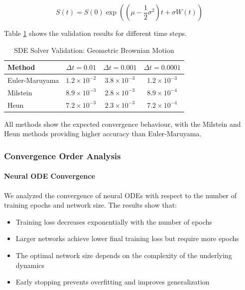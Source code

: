 \begin{equation}
S(t) = S(0) \exp\left((\mu - \frac{1}{2}\sigma^2)t + \sigma W(t)\right)
\end{equation}

Table \ref{tab:sde_validation} shows the validation results for different time steps.

\begin{table}[h]
\centering
\caption{SDE Solver Validation: Geometric Brownian Motion}
\label{tab:sde_validation}
\begin{tabular}{lccc}
\toprule
Method & $\Delta t = 0.01$ & $\Delta t = 0.001$ & $\Delta t = 0.0001$ \\
\midrule
Euler-Maruyama & $1.2 \times 10^{-2}$ & $3.8 \times 10^{-3}$ & $1.2 \times 10^{-3}$ \\
Milstein & $8.9 \times 10^{-3}$ & $2.8 \times 10^{-3}$ & $8.9 \times 10^{-4}$ \\
Heun & $7.2 \times 10^{-3}$ & $2.3 \times 10^{-3}$ & $7.2 \times 10^{-4}$ \\
\bottomrule
\end{tabular}
\end{table}

All methods show the expected convergence behaviour, with the Milstein and Heun methods providing higher accuracy than Euler-Maruyama.

\subsubsection{Convergence Order Analysis}

\paragraph{Neural ODE Convergence}
We analyzed the convergence of neural ODEs with respect to the number of training epochs and network size. The results show that:

\begin{itemize}
    \item Training loss decreases exponentially with the number of epochs
    \item Larger networks achieve lower final training loss but require more epochs
    \item The optimal network size depends on the complexity of the underlying dynamics
    \item Early stopping prevents overfitting and improves generalization
\end{itemize}

